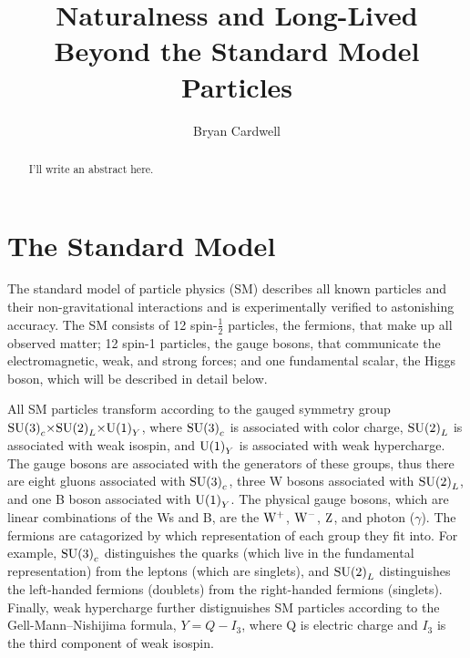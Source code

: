 \documentclass[12pt]{article}
\title{Naturalness and Long-Lived Beyond the Standard Model Particles}
\author{Bryan Cardwell}
\begin{document}
\singlespacing
\maketitle

\begin{abstract}

I'll write an abstract here.

\end{abstract}

\newpage
\tableofcontents
\newpage
\doublespacing
{}

\section{The Standard Model} \label{SM}
    The standard model of particle physics (SM) describes all known particles and their non-gravitational interactions and is experimentally verified to astonishing  accuracy. The SM consists of \num{12} spin-$\frac{1}{2}$ particles, the fermions, that make up all observed matter; \num{12} spin-1 particles, the gauge bosons, that communicate the electromagnetic, weak, and strong forces; and one fundamental scalar, the Higgs boson, which will be described in detail below.
    
    All SM particles transform according to the gauged symmetry group $\mathrm{SU} {\left(3\right)}_c {\times} \mathrm{SU} {\left(2\right)}_L {\times} \mathrm{U} {\left(1\right)}_Y$, where $\mathrm{SU} {\left(3\right)}_c$ is associated with color charge, $\mathrm{SU} {\left(2\right)}_L$ is associated with weak isospin, and $\mathrm{U} {\left(1\right)}_Y$ is associated with weak hypercharge. The gauge bosons are associated with the generators of these groups, thus there are eight gluons associated with $\mathrm{SU} {\left(3\right)}_c$, three W bosons associated with $\mathrm{SU} {\left(2\right)}_L$, and one B boson associated with $\mathrm{U} {\left(1\right)}_Y$. The physical gauge bosons, which are linear combinations of the Ws and B, are the $\mathrm{W}^+$, $\mathrm{W}^-$, $\mathrm{Z}$, and photon ($\gamma$). The fermions are catagorized by which representation of each group they fit into. For example, $\mathrm{SU} {\left(3\right)}_c$ distinguishes the quarks (which live in the fundamental representation) from the leptons (which are singlets), and $\mathrm{SU} {\left(2\right)}_L$ distinguishes the left-handed fermions (doublets) from the right-handed fermions (singlets). Finally, weak hypercharge further distignuishes SM particles according to the Gell-Mann--Nishijima formula, $Y=Q-I_3$, where Q is electric charge and $I_3$ is the third component of weak isospin.
\end{document}
